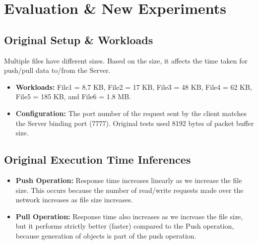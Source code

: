 \documentclass[12pt,a4paper]{article}
\begin{document}
\section{Evaluation \& New Experiments}

\subsection{Original Setup \& Workloads}
Multiple files have different sizes. Based on the size, it affects the time taken for push/pull data to/from the Server.
\begin{itemize}
    \item \textbf{Workloads:} File1 = 8.7 KB, File2 = 17 KB, File3 = 48 KB, File4 = 62 KB, File5 = 185 KB, and File6 = 1.8 MB.
    \item \textbf{Configuration:} The port number of the request sent by the client matches the Server binding port (7777). Original tests used 8192 bytes of packet buffer size.
\end{itemize}

\subsection{Original Execution Time Inferences}
\begin{itemize}
    \item \textbf{Push Operation:} Response time increases linearly as we increase the file size. This occurs because the number of read/write requests made over the network increases as file size increases.
    \item \textbf{Pull Operation:} Response time also increases as we increase the file size, but it performs strictly better (faster) compared to the Push operation, because generation of objects is part of the push operation.
\end{itemize}
\end{document}
